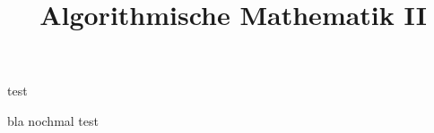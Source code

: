 \documentclass[a4paper]{article}
\title{Algorithmische Mathematik II}
\begin{document}
    \maketitle
    \tableofcontents
    
    
    
    
    
    \begin{verbetering}
        test
    \end{verbetering}
    \begin{noot}{bla}
        nochmal test
    \end{noot}
\end{document}

